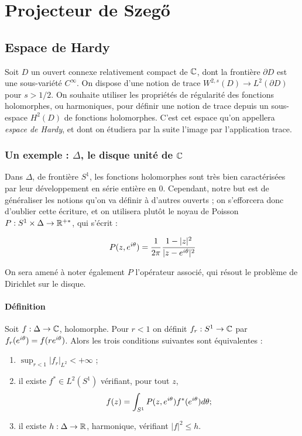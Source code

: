 \chapter{Projecteur de Szeg\H{o}}

\section{Espace de Hardy}

Soit $D$ un ouvert connexe relativement compact de $\mathbb{C}$, dont la frontière $\partial D$ est une sous-variété $C^{\infty}$. On dispose d'une notion de trace $W^{2,s}(D) \to L^2(\partial D)$ pour $s > 1/2$. On souhaite utiliser les propriétés de régularité des fonctions holomorphes, ou harmoniques, pour définir une notion de trace depuis un sous-espace $H^2(D)$ de fonctions holomorphes. C'est cet espace qu'on appellera \emph{espace de Hardy}, et dont on étudiera par la suite l'image par l'application trace.

\subsection{Un exemple : $\Delta$, le disque unité de $\mathbb{C}$}

Dans $\Delta$, de frontière $S^1$, les fonctions holomorphes sont très bien caractérisées par leur développement en série entière en 0. Cependant, notre but est de généraliser les notions qu'on va définir à d'autres ouverts ; on s'efforcera donc d'oublier cette écriture, et on utilisera plutôt le noyau de Poisson $P : S^1 \times \Delta \to \mathbb{R}^{+*}$, qui s'écrit :

\begin{equation}
	P(z,e^{i\theta}) = \cfrac{1}{2\pi}\,\cfrac{1-|z|^2}{|z-e^{i\theta}|^2}
\end{equation}

On sera amené à noter également $P$ l'opérateur associé, qui résout le problème de Dirichlet sur le disque.

\subsubsection{Définition}

\begin{prop}
Soit $f : \Delta \to \mathbb{C}$, holomorphe. Pour $r <1$ on définit $f_r : S^1 \to \mathbb{C}$ par $f_r(e^{i\theta})=f(re^{i\theta})$. Alors les trois conditions suivantes sont équivalentes :
\begin{enumerate}
\item $\sup_{r<1}|f_r|_{L^2} < + \infty$ ;
\item il existe $ f^* \in L^2(S^1)$ vérifiant, pour tout $z$,
\begin{equation*}
	f(z) = \int_{S^1}P(z,e^{i\theta})f^*(e^{i\theta})d\theta ;
\end{equation*}
\item il existe $h : \Delta \to \mathbb{R}$, harmonique, vérifiant $|f|^2 \leq h$.
\end{enumerate}
\end{prop}

